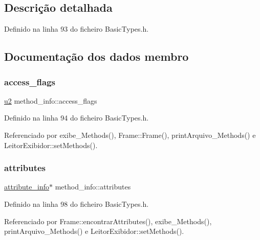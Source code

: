 \subsection{Descrição detalhada}


Definido na linha 93 do ficheiro Basic\+Types.\+h.



\subsection{Documentação dos dados membro}
\mbox{\label{structmethod__info_a3b657027a141cdbc94ded28607c98be5}} 
\subsubsection{\texorpdfstring{access\+\_\+flags}{access\_flags}}
{\footnotesize\ttfamily \hyperlink{BasicTypes_8h_a732cde1300aafb73b0ea6c2558a7a54f}{u2} method\+\_\+info\+::access\+\_\+flags}



Definido na linha 94 do ficheiro Basic\+Types.\+h.



Referenciado por exibe\+\_\+\+Methods(), Frame\+::\+Frame(), print\+Arquivo\+\_\+\+Methods() e Leitor\+Exibidor\+::set\+Methods().

\mbox{\label{structmethod__info_a8ce4caaa03680c91f548558a38647ad8}} 
\subsubsection{\texorpdfstring{attributes}{attributes}}
{\footnotesize\ttfamily \hyperlink{structattribute__info}{attribute\+\_\+info}$\ast$ method\+\_\+info\+::attributes}



Definido na linha 98 do ficheiro Basic\+Types.\+h.



Referenciado por Frame\+::encontrar\+Attributes(), exibe\+\_\+\+Methods(), print\+Arquivo\+\_\+\+Methods() e Leitor\+Exibidor\+::set\+Methods().

